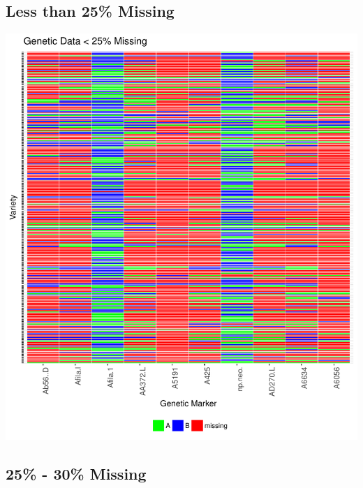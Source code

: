 \documentclass[11pt]{article}\usepackage[]{graphicx}\usepackage[]{color}
\makeatletter
\def\maxwidth{ %
  \ifdim\Gin@nat@width>\linewidth
    \linewidth
  \else
    \Gin@nat@width
  \fi
}
\newenvironment{knitrout}{}{} %
\makeatother
\begin{document}
\pagebreak

\subsection{Less than 25\% Missing}




\begin{knitrout}\footnotesize
{}\color{fgcolor}

{\centering \includegraphics[width=\maxwidth]{figure/missing_plot25-1} 

}



\end{knitrout}
\pagebreak
\subsection{25\% - 30\% Missing}
\end{document}
